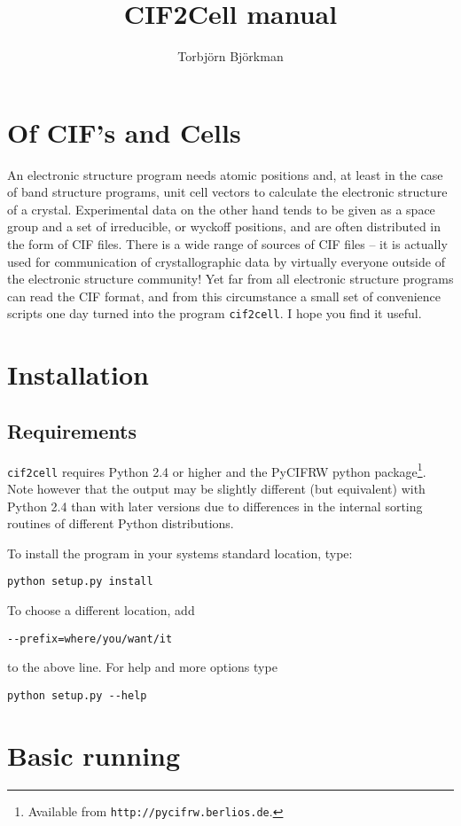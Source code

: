 \documentclass[11pt]{article}
\title{CIF2Cell manual}
\author{Torbj\"orn Bj\"orkman}
\newcommand{\ciftocell}{\texttt{cif2cell}}
\begin{document}
\maketitle
\section{Of CIF's and Cells}
An electronic structure program needs atomic positions and, at least in the case of band structure programs, unit cell vectors to calculate the electronic structure of a crystal. Experimental data on the other hand tends to be given as a space group and a set of irreducible, or wyckoff positions, and are often distributed in the form of CIF files. There is a wide range of sources of CIF files -- it is actually used for communication of crystallographic data by virtually everyone outside of the electronic structure community! Yet far from all electronic structure programs can read the CIF format, and from this circumstance a small set of convenience scripts one day turned into the program \ciftocell. I hope you find it useful.

\section{Installation}
\subsection{Requirements}
\ciftocell{} requires Python 2.4 or higher and the PyCIFRW python package\footnote{Available from \texttt{http://pycifrw.berlios.de}.}. Note however that the output may be slightly different (but equivalent) with Python 2.4 than with later versions due to differences in the internal sorting routines of different Python distributions.

To install the program in your systems standard location, type:
\begin{verbatim}
python setup.py install 
\end{verbatim}
To choose a different location, add 
\begin{verbatim}
--prefix=where/you/want/it 
\end{verbatim}
to the above line. For help and more options type
\begin{verbatim}
python setup.py --help
\end{verbatim}


\section{Basic running}
\end{document}
